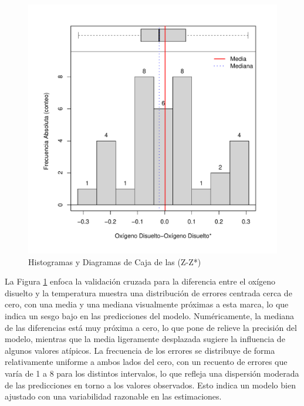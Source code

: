 \begin{figure}[!htb]
    \centering
    \includegraphics[width=0.5\linewidth]{Figuras_AED//ESTIMACION/Oxígeno_Disuelto-Oxígeno_Disuelt+_HistBoxPlot1CoKrig.pdf}
    \caption{Histogramas y Diagramas de Caja de las (Z-Z*) }
    \label{fig:enter-labelcdfr}
\end{figure}
La Figura  \ref{fig:enter-labelcdfr} enfoca la validación cruzada para la diferencia entre el oxígeno disuelto y la temperatura muestra una distribución de errores centrada cerca de cero, con una media y una mediana visualmente próximas a esta marca, lo que indica un sesgo bajo en las predicciones del modelo. Numéricamente, la mediana de las diferencias está muy próxima a cero, lo que pone de relieve la precisión del modelo, mientras que la media ligeramente desplazada sugiere la influencia de algunos valores atípicos. La frecuencia de los errores se distribuye de forma relativamente uniforme a ambos lados del cero, con un recuento de errores que varía de 1 a 8 para los distintos intervalos, lo que refleja una dispersión moderada de las predicciones en torno a los valores observados. Esto indica un modelo bien ajustado con una variabilidad razonable en las estimaciones.


